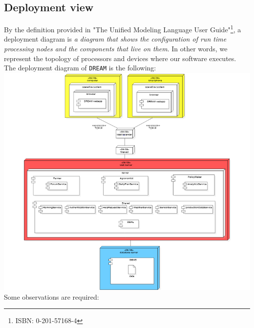 \documentclass{article}
\begin{document}
\subsection{Deployment view}
By the definition provided in "The Unified Modeling Language User Guide"\footnote{ISBN: 0-201-57168-4}, a deployment diagram is \textit{a diagram that shows the configuration of run time processing nodes and the components that live on them}. In other words, we represent the topology of processors and devices where our software executes.\\
The deployment diagram of \verb|DREAM| is the following:
\newpage
\includegraphics[trim=5cm 15cm 1cm 10cm,width=16.5cm]{diagrams/deployment_diagram.png}
\newpage
Some observations are required:
\end{document}
